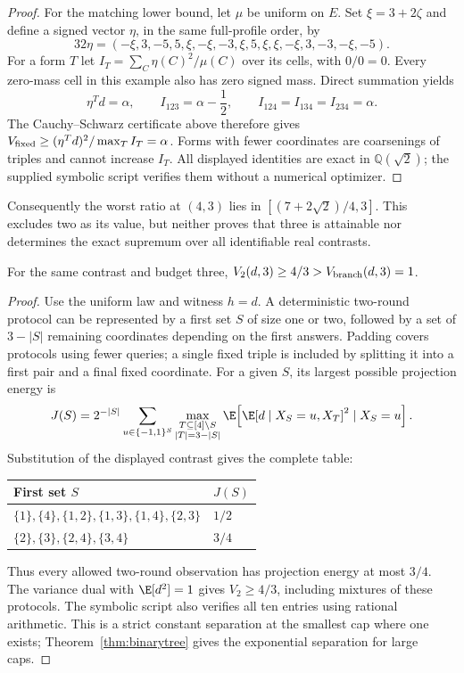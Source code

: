 \begin{proof}
For the matching lower bound, let $\mu$ be uniform on $E$. Set $\xi=3+2\zeta$ and define a signed vector $\eta$, in the same full-profile order, by
\[
 32\eta=(-\xi,3,-5,5,\xi,-\xi,-3,\xi,5,\xi,\xi,-\xi,3,-3,-\xi,-5).
\]
For a form $T$ let $I_T=\sum_C\eta(C)^2/\mu(C)$ over its cells, with $0/0=0$. Every zero-mass cell in this example also has zero signed mass. Direct summation yields
\[
 \eta^Td=\alpha,\qquad
 I_{123}=\alpha-\frac12,\qquad
 I_{124}=I_{134}=I_{234}=\alpha.
\]
The Cauchy--Schwarz certificate above therefore gives $V_{\rm fixed}\ge(\eta^Td)^2/\max_T I_T=\alpha$. Forms with fewer coordinates are coarsenings of triples and cannot increase $I_T$. All displayed identities are exact in $\mathbb Q(\sqrt2)$; the supplied symbolic script verifies them without a numerical optimizer.
\end{proof}
Consequently the worst ratio at $(4,3)$ lies in $[(7+2\sqrt2)/4,3]$. This excludes two as its value, but neither proves that three is attainable nor determines the exact supremum over all identifiable real contrasts.

\begin{corollary}\label{cor:roundseparation}
For the same contrast and budget three, $V_2(d,3)\ge4/3>V_{\rm branch}(d,3)=1$.
\end{corollary}
\begin{proof}
Use the uniform law and witness $h=d$. A deterministic two-round protocol can be represented by a first set $S$ of size one or two, followed by a set of $3-|S|$ remaining coordinates depending on the first answers. Padding covers protocols using fewer queries; a single fixed triple is included by splitting it into a first pair and a final fixed coordinate. For a given $S$, its largest possible projection energy is
\[
 J(S)=2^{-|S|}\sum_{u\in\{-1,1\}^S}
 \max_{\substack{T\subseteq[4]\setminus S\\|T|=3-|S|}}
 \E\!\left[\E[d\mid X_S=u,X_T]^2\mid X_S=u\right].
\]
Substitution of the displayed contrast gives the complete table:
\begin{center}
\begin{tabular}{ll}
\toprule
First set $S$ & $J(S)$\\
\midrule
$\{1\},\{4\},\{1,2\},\{1,3\},\{1,4\},\{2,3\}$ & $1/2$\\
$\{2\},\{3\},\{2,4\},\{3,4\}$ & $3/4$\\
\bottomrule
\end{tabular}
\end{center}
Thus every allowed two-round observation has projection energy at most $3/4$. The variance dual with $\E[d^2]=1$ gives $V_2\ge4/3$, including mixtures of these protocols. The symbolic script also verifies all ten entries using rational arithmetic. This is a strict constant separation at the smallest cap where one exists; Theorem~\ref{thm:binarytree} gives the exponential separation for large caps.
\end{proof}
